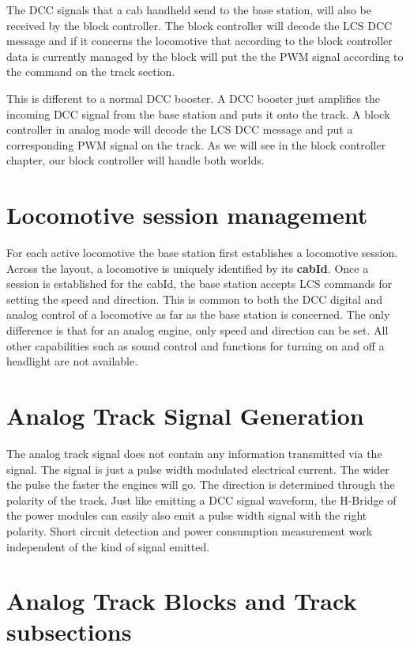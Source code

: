 The DCC signals that a cab handheld send to the base station, will also be received by the block controller. The block controller will decode the LCS DCC message and if it concerns the locomotive that according to the block controller data is currently managed by the block will put the the PWM signal according to the command on the track section.

This is different to a normal DCC booster. A DCC booster just amplifies the incoming DCC signal from the base station and puts it onto the track. A block controller in analog mode will decode the LCS DCC message and put a corresponding PWM signal on the track. As we will see in the block controller chapter, our block controller will handle both worlds.

\section{Locomotive session management}

For each active locomotive the base station first establishes a locomotive session. Across the layout, a locomotive is uniquely identified by its \textbf{cabId}. Once a session is established for the cabId, the base station accepts LCS commands for setting the speed and direction. This is common to both the DCC digital and analog control of a locomotive as far as the base station is concerned. The only difference is that for an analog engine, only speed and direction can be set. All other capabilities such as sound control and functions for turning on and off a headlight are not available.

\section{Analog Track Signal Generation}

The analog track signal does not contain any information transmitted via the signal. The signal is just a pulse width modulated electrical current. The wider the pulse the faster the engines will go. The direction is determined through the polarity of the track. Just like emitting a DCC signal waveform, the H-Bridge of the power modules can easily also emit a pulse width signal with the right polarity. Short circuit detection and power consumption measurement work independent of the kind of signal emitted.

\section{Analog Track Blocks and Track subsections}

